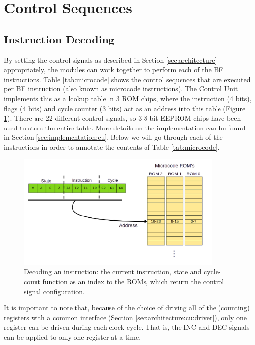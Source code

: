 \section{Control Sequences} \label{sec:sequences}
\subsection{Instruction Decoding}
By setting the control signals as described in Section \ref{sec:architecture} appropriately, the modules can work together to perform each of the BF instructions. Table \ref{tab:microcode} shows the control sequences that are executed per BF instruction (also known as microcode instructions). The Control Unit implements this as a lookup table in 3 ROM chips, where the instruction (4 bits), flags (4 bits) and cycle counter (3 bits) act as an address into this table (Figure \ref{fig:decoder}). There are 22 different control signals, so 3 8-bit EEPROM chips have been used to store the entire table. More details on the implementation can be found in Section \ref{sec:implementation:cu}. Below we will go through each of the instructions in order to annotate the contents of Table \ref{tab:microcode}.

\begin{figure}[H]
  \centering
  \includegraphics[width=0.9\textwidth]{img/instruction_decoding}
  \caption{Decoding an instruction: the current instruction, state and cycle-count function as an index to the ROMs, which return the control signal configuration.}
  \label{fig:decoder}
\end{figure}

It is important to note that, because of the choice of driving all of the (counting) registers with a common interface (Section \ref{sec:architecture:cu:driver}), only one register can be driven during each clock cycle. That is, the INC and DEC signals can be applied to only one register at a time. 


